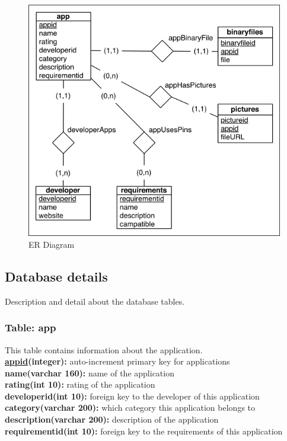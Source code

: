 		\begin{figure}[H]
		\includegraphics[scale=1]{images/ER_Diagram.png}
		\caption{ER Diagram}
		\label{fig:erdiagram}
		\end{figure}

	\subsection{Database details}

		Description and detail about the database tables.

		\subsubsection{Table: app}

			This table contains information about the application.\\

			{\bf \underline{appid}(integer):} auto-increment primary key for applications  \\
			\textbf{name(varchar 160):} name of the application \\
			\textbf{rating(int 10):} rating of the application \\
			\textbf{developerid(int 10):} foreign key to the developer of this application \\
			\textbf{category(varchar 200):} which category this application belongs to \\
			\textbf{description(varchar 200):} description of the application \\
			\textbf{requirementid(int 10):} foreign key to the requirements of this application \\


